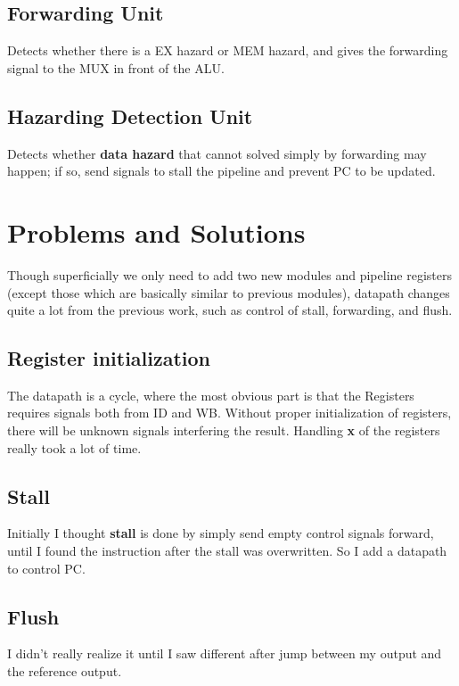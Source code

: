 \documentclass{article}
\begin{document}
\subsection{Forwarding Unit}
Detects whether there is a EX hazard or MEM hazard, and gives the forwarding signal to the {\cs MUX} in front of the {\cs ALU}.
\subsection{Hazarding Detection Unit}
Detects whether {\bf data hazard} that cannot solved simply by forwarding may happen; if so, send signals to stall the pipeline and prevent {\cs PC} to be updated.

\section{Problems and Solutions}
Though superficially we only need to add two new modules and pipeline registers (except those which are basically similar to previous modules),
datapath changes quite a lot from the previous work, such as control of stall, forwarding, and flush.
\subsection{Register initialization}
The datapath is a cycle, where the most obvious part is that the {\cs Registers} requires signals both from ID and WB. 
Without proper initialization of registers, there will be unknown signals interfering the result.
Handling {\bf x} of the registers really took a lot of time.
\subsection{Stall}
Initially I thought {\bf stall} is done by simply send empty control signals forward, until I found the instruction after the stall was overwritten.
So I add a datapath to control {\cs PC}.
\subsection{Flush}
I didn't really realize it until I saw different after {\cs jump} between my output and the reference output.
\end{document}
